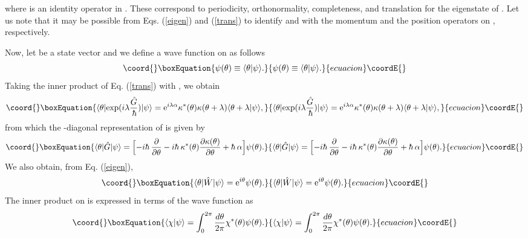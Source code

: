 \documentclass[a4paper,12pt]{article}
\begin{document}
where \coordHE{} is an identity operator in \coordHE{}.
These correspond to periodicity, orthonormality, completeness, and 
translation for the eigenstate of \myHighlight{$\hw$}\coordHE{}. Let us note that 
it may be possible from Eqs. (\ref{eigen}) and (\ref{trans}) to 
identify \myHighlight{$\hg$}\coordHE{} and \myHighlight{$\hw$}\coordHE{} with the momentum and 
the position operators on \coordHE{}, respectively. 
\par
Now, let \myHighlight{$\ket{\psi}$}\coordHE{} be a state vector and we define a wave function
\myHighlight{$\psi(\theta)$}\coordHE{} on \coordHE{} as follows
\begin{equation}\coord{}\boxEquation{
\psi(\theta)\equiv \norm{\theta}{\psi}.
}{
\psi(\theta)\equiv \norm{\theta}{\psi}.
}{ecuacion}\coordE{}\end{equation}
Taking the inner product of Eq. (\ref{trans}) with \myHighlight{$\ket{\psi}$}\coordHE{}, we obtain
\begin{equation}\coord{}\boxEquation{
\bra{\theta}{\rm exp}(i\lambda{\hg\over\hbar})\ket{\psi}
=\e^{i\lambda\alpha}\kappa^*(\theta)\kappa(\theta+\lambda)
\norm{\theta+\lambda}{\psi}, 
}{
\bra{\theta}{\rm exp}(i\lambda{\hg\over\hbar})\ket{\psi}
=\e^{i\lambda\alpha}\kappa^*(\theta)\kappa(\theta+\lambda)
\norm{\theta+\lambda}{\psi}, 
}{ecuacion}\coordE{}\end{equation}
from which the \myHighlight{$\hw$}\coordHE{}-diagonal representation of \myHighlight{$\hg$}\coordHE{} is given by
\begin{equation}\coord{}\boxEquation{
\bra{\theta}{\hg}\ket{\psi}=
\Bigl[-i\hbar~{\del\over{\del\theta}}-i\hbar~\kappa^*(\theta)
{{\del\kappa(\theta)}\over {\del\theta}}+\hbar~\alpha\Bigr]\psi(\theta).
\label{repreg}
}{
\bra{\theta}{\hg}\ket{\psi}=
\Bigl[-i\hbar~{\del\over{\del\theta}}-i\hbar~\kappa^*(\theta)
{{\del\kappa(\theta)}\over {\del\theta}}+\hbar~\alpha\Bigr]\psi(\theta).
}{ecuacion}\coordE{}\end{equation}
We also obtain, from Eq. (\ref{eigen}),
\begin{equation}\coord{}\boxEquation{
\bra{\theta}{\hw}\ket{\psi}=\e^{i\theta}\psi(\theta).
\label{reprew}
}{
\bra{\theta}{\hw}\ket{\psi}=\e^{i\theta}\psi(\theta).
}{ecuacion}\coordE{}\end{equation}
The inner product on \coordHE{} is expressed in terms 
of the wave function as
\begin{equation}\coord{}\boxEquation{
\norm{\chi}{\psi}=\int_0^{2\pi}{{d\theta}\over {2\pi}}
\chi^*(\theta)\psi(\theta).
}{
\norm{\chi}{\psi}=\int_0^{2\pi}{{d\theta}\over {2\pi}}
\chi^*(\theta)\psi(\theta).
}{ecuacion}\coordE{}\end{equation} 
\end{document}
